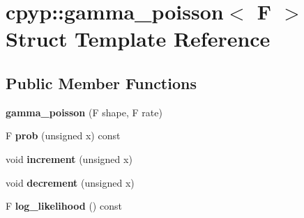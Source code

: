 \hypertarget{structcpyp_1_1gamma__poisson}{}\section{cpyp\+:\+:gamma\+\_\+poisson$<$ F $>$ Struct Template Reference}
\label{structcpyp_1_1gamma__poisson}
\subsection*{Public Member Functions}
\begin{DoxyCompactItemize}
\item 
\mbox{\label{structcpyp_1_1gamma__poisson_abcac392e73795f25771d23804e6204f6}} 
{\bfseries gamma\+\_\+poisson} (F shape, F rate)
\item 
\mbox{\label{structcpyp_1_1gamma__poisson_a47b9a0b1974a8a95362a4e47641aeb3f}} 
F {\bfseries prob} (unsigned x) const
\item 
\mbox{\label{structcpyp_1_1gamma__poisson_a8039c023e473cd82e0f184e5da5a92eb}} 
void {\bfseries increment} (unsigned x)
\item 
\mbox{\label{structcpyp_1_1gamma__poisson_ab7cc4bebe1695c4f7ab5f029808a03cd}} 
void {\bfseries decrement} (unsigned x)
\item 
\mbox{\label{structcpyp_1_1gamma__poisson_af5d7a65118ad6c82cc860c73ba3da5fe}} 
F {\bfseries log\+\_\+likelihood} () const
\end{DoxyCompactItemize}
